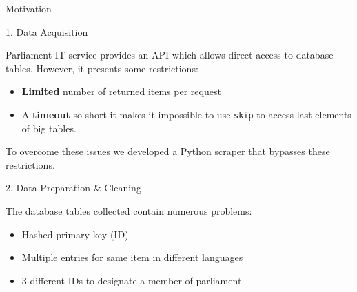 \documentclass[final]{beamer}
\newlength{\onecolwid}
\begin{document}
\begin{frame}[t]
\begin{columns}[t]
\begin{column}{\onecolwid}
\begin{block}{Motivation}
\end{block}


\begin{alertblock}{1. Data Acquisition}

Parliament IT service provides an API which allows direct access to database tables. However, it presents some restrictions:

\begin{itemize}
\item \textbf{Limited} number of returned items per request
\item A \textbf{timeout} so short it makes it impossible to use \texttt{skip} to access last elements of big tables.
\end{itemize}

To overcome these issues we developed a Python scraper that bypasses these restrictions.

\end{alertblock}


\begin{alertblock}{2. Data Preparation \& Cleaning}

The database tables collected contain numerous problems:
\begin{itemize}
\item Hashed primary key (ID)
\item Multiple entries for same item in different languages
\item 3 different IDs to designate a member of parliament
\end{itemize}

\end{alertblock}







\end{column}
\end{columns}
\end{frame}
\end{document}

